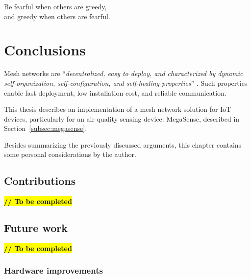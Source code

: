 
\begin{savequote}[70mm]
	Be fearful when others are greedy,\\
	and greedy when others are fearful.
\end{savequote}

\chapter{Conclusions}\label{chapter:conclusions}

	Mesh networks are ``\textit{decentralized, easy to deploy, and characterized by dynamic self-organization, self-configuration, and self-healing properties}'' \cite{Sampaio-2015}.
	Such properties enable fast deployment, low installation cost, and reliable communication.
	
	This thesis describes an implementation of a mesh network solution for IoT devices, particularly for an air quality sensing device: MegaSense, described in Section~\ref{subsec:megasense}.
	
%	
	
	Besides summarizing the previously discussed arguments, this chapter contains some personal considerations by the author.

	\section{Contributions}
	
		\textbf{\textcolor{red}{\hl{// To be completed}}}

	\section{Future work}
		
		\textbf{\textcolor{red}{\hl{// To be completed}}}
	
		\subsection{Hardware improvements}
			
		

